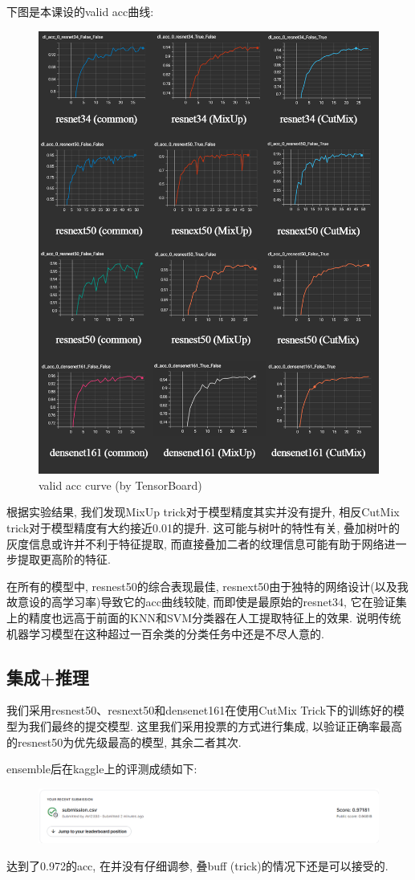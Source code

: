 \documentclass[lang=cn,12pt,a4paper]{elegantpaper}
\begin{document}
下图是本课设的valid acc曲线:

\begin{figure}[p]
    \centering
    \includegraphics[width=\textwidth]{lateximgs/5.png}
    \caption{valid acc curve (by TensorBoard)}
\end{figure}

\newpage
根据实验结果, 我们发现MixUp trick对于模型精度其实并没有提升, 相反CutMix trick对于模型精度有大约接近0.01的提升. 这可能与树叶的特性有关, 叠加树叶的灰度信息或许并不利于特征提取, 而直接叠加二者的纹理信息可能有助于网络进一步提取更高阶的特征.

在所有的模型中, resnest50的综合表现最佳, resnext50由于独特的网络设计(以及我故意设的高学习率)导致它的acc曲线较陡, 而即使是最原始的resnet34, 它在验证集上的精度也远高于前面的KNN和SVM分类器在人工提取特征上的效果. 说明传统机器学习模型在这种超过一百余类的分类任务中还是不尽人意的.

\subsection{集成+推理}
我们采用resnest50、resnext50和densenet161在使用CutMix Trick下的训练好的模型为我们最终的提交模型. 这里我们采用投票的方式进行集成, 以验证正确率最高的resnest50为优先级最高的模型, 其余二者其次.

ensemble后在kaggle上的评测成绩如下:
\begin{figure}[h]
    \centering
    \includegraphics[width=\textwidth]{lateximgs/6.png}
    
\end{figure}

达到了0.972的acc, 在并没有仔细调参, 叠buff (trick)的情况下还是可以接受的.

% 

\end{document}
